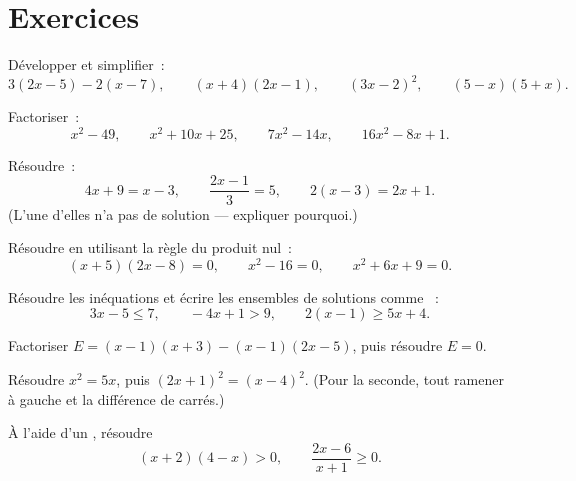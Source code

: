 \section{Exercices}

\begin{exercise}[$\star$]\label{exo:g10:algebra:1}
Développer et simplifier~:
\[
3(2x - 5) - 2(x - 7), \qquad
(x + 4)(2x - 1), \qquad
(3x - 2)^2, \qquad
(5 - x)(5 + x).
\]
\end{exercise}

\begin{exercise}[$\star$]\label{exo:g10:algebra:2}
Factoriser~:
\[
x^2 - 49, \qquad
x^2 + 10x + 25, \qquad
7x^2 - 14x, \qquad
16x^2 - 8x + 1 .
\]
\end{exercise}

\begin{exercise}[$\star$]\label{exo:g10:algebra:3}
Résoudre~:
\[
4x + 9 = x - 3, \qquad
\frac{2x - 1}{3} = 5, \qquad
2(x - 3) = 2x + 1 .
\]
(L'une d'elles n'a pas de solution --- expliquer pourquoi.)
\end{exercise}

\begin{exercise}[$\star$]\label{exo:g10:algebra:4}
Résoudre en utilisant la règle du produit nul~:
\[
(x + 5)(2x - 8) = 0, \qquad
x^2 - 16 = 0, \qquad
x^2 + 6x + 9 = 0 .
\]
\end{exercise}

\begin{exercise}[$\star$]\label{exo:g10:algebra:5}
Résoudre les inéquations et écrire les ensembles de solutions comme
~:
\[
3x - 5 \leq 7, \qquad
-4x + 1 > 9, \qquad
2(x - 1) \geq 5x + 4 .
\]
\end{exercise}

\begin{exercise}[$\star\star$]\label{exo:g10:algebra:6}
Factoriser $E = (x - 1)(x + 3) - (x - 1)(2x - 5)$, puis résoudre
$E = 0$.
\end{exercise}

\begin{exercise}[$\star\star$]\label{exo:g10:algebra:7}
Résoudre $x^2 = 5x$, puis $(2x + 1)^2 = (x - 4)^2$. (Pour la seconde,
tout ramener à gauche et  la différence de carrés.)
\end{exercise}

\begin{exercise}[$\star\star$]\label{exo:g10:algebra:8}
À l'aide d'un , résoudre
\[
(x + 2)(4 - x) > 0,
\qquad
\frac{2x - 6}{x + 1} \geq 0 .
\]
\end{exercise}

